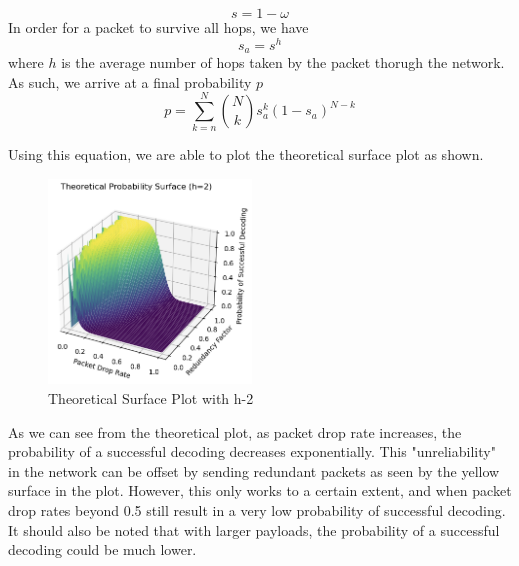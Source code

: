 \begin{equation} \label{eq: yPlus}
    s = 1-\omega
\end{equation}
In order for a packet to survive all hops, we have 
\begin{equation} \label{eq: yPlus}
    s_a = s^{h}
\end{equation}
where $h$ is the average number of hops taken by the packet thorugh the network. As such, we arrive at a final probability $p$ \\

\begin{equation} \label{eq: yPlus}
    p = \sum_{k=n}^{N}{N\choose k}s_a^k(1-s_a)^{N-k}
\end{equation}

Using this equation, we are able to plot the theoretical surface plot as shown.

\begin{figure}[ht]
    \includegraphics[width=0.48\textwidth]{2hops.png}  %
    \caption{Theoretical Surface Plot with h-2}  %
\end{figure}

As we can see from the theoretical plot, as packet drop rate increases, the probability of a successful decoding decreases exponentially. 
This "unreliability" in the network can be offset by sending redundant packets as seen by the yellow surface in the plot. However, this only works to a certain extent, and when 
packet drop rates beyond 0.5 still result in a very low probability of successful decoding. It should also be noted that with larger payloads, the probability of a successful decoding could
be much lower. 




